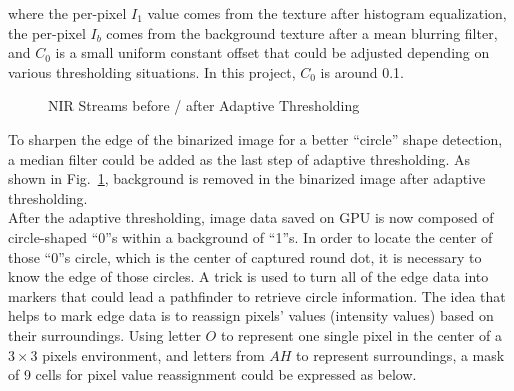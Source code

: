 %
where the per-pixel \(I_1\) value comes from the texture after histogram equalization, the per-pixel \(I_b\) comes from the background texture after a mean blurring filter, and \(C_0\) is a small uniform constant offset that could be adjusted depending on various thresholding situations. In this project, \(C_0\) is around 0.1. %
%
\begin{figure}[t]
\hspace*{-0.5cm}
\centering
{}
\caption{\gls{NIR} Streams before / after Adaptive Thresholding}
\label{Adaptive_Thresholding}
\end{figure}%
To sharpen the edge of the binarized image for a better \enquote{circle} shape detection, a median filter could be added as the last step of adaptive thresholding. As shown in Fig.~\ref{Adaptive_Thresholding}, background is removed in the binarized image after adaptive thresholding.
\\\indent
%
%
After the adaptive thresholding, image data saved on \gls{GPU} is now composed of circle-shaped \enquote{0}s within a background of \enquote{1}s. In order to locate the center of those \enquote{0}s circle, which is the center of captured round dot, it is necessary to know the edge of those circles. A trick is used to turn all of the edge data into markers that could lead a pathfinder to retrieve circle information. %
%
The idea that helps to mark edge data is to reassign pixels' values (intensity values) based on their surroundings. Using letter \(O\) to represent one single pixel in the center of a $3\times3$ pixels environment, and letters from \(A\)\texttildelow \(H\) to represent surroundings, a mask of 9 cells for pixel value reassignment could be expressed as below.

